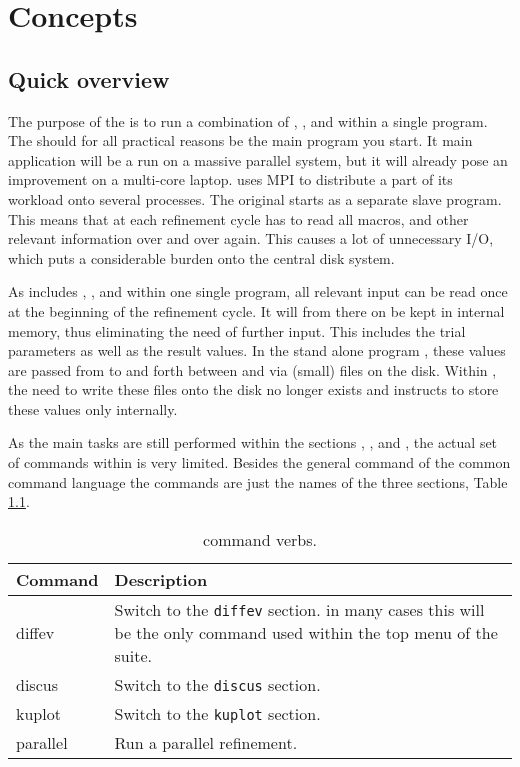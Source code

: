 
\chapter{Concepts \label{concepts}}
\section{Quick overview } 

The purpose of the \Suite is to run a combination of 
\href{./diffev\_man.pdf}\diffev, 
\href{./discus\_man.pdf}\discus,
and 
\href{./kuplot\_man.pdf}\Kuplot within a single program. The \Suite 
should for all practical reasons be the main program you start.
It main application  will be a 
run on a massive parallel system, but it will already pose an 
improvement on a multi-core laptop. \Suite uses MPI to distribute 
a part of its workload onto several processes. The original \Diffev
starts \Discus as a separate slave program. This means that at each refinement
cycle \Discus has to read all macros, and other relevant information over and 
over again. This causes a lot of unnecessary I/O, which puts a considerable
burden onto the central disk system.

As \Suite includes \diffev, \discus, and \Kuplot within one single program,
all relevant input can be read once at the beginning of the refinement cycle.
It will from there on be kept in internal memory, thus eliminating the need of
further input. This includes the trial parameters as well as the result values.
In the stand alone program \diffev, these values are passed from \Diffev to
and forth between \Discus and \Kuplot via (small) files on the disk. Within
\suite, the need to write these files onto the disk no longer exists and 
\Suite instructs \Diffev to store these values only internally.  

As the main tasks are still performed within the sections \diffev, \discus,
and \kuplot, the actual set of commands within \Suite is very limited. 
Besides the general command of the common command language the commands are
just the names of the three sections, Table \ref{cmd-tab}.

\begin{table}[!b]
\centering
\begin{tabularx}{\textwidth}{|p{30mm}|X|}
  \hline
  {\bf Command } & {\bf Description} \\
  \hline
  diffev & Switch to the {\tt diffev} section. in many cases this
           will be the only command used within the top menu of
           the suite.\\
  \hline
  discus & Switch to the {\tt discus} section.\\
  \hline
  kuplot & Switch to the {\tt kuplot} section.\\
  \hline
  parallel & Run a parallel refinement. \\
  \hline
\end{tabularx}
\caption[\Suite command verbs ]
        {\label{cmd-tab}\Suite command verbs.}
\end{table}

